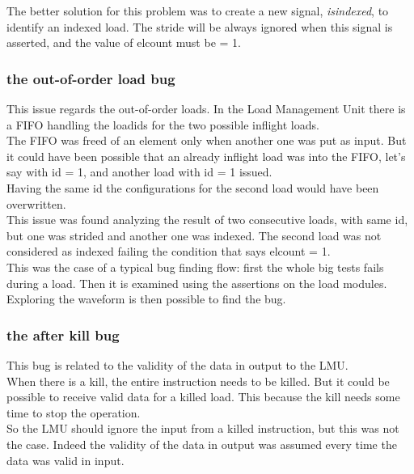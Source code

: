 The better solution for this problem was to create a new signal, \emph{is\+indexed}, to identify an indexed load. The stride will be always ignored when this signal is asserted, and the value of el\+count must be = 1.\\

\subsubsection{the out-of-order load bug}
This issue regards the out-of-order loads. In the Load Management Unit there is a FIFO handling the load\+ids for the two possible inflight loads.\\

The FIFO was freed of an element only when another one was put as input. But it could have been possible that an already inflight load was into the FIFO, let's say with id = 1, and another load with id = 1 issued. \\
Having the same id the configurations for the second load would have been overwritten.\\

This issue was found analyzing the result of two consecutive loads, with same id, but one was strided and another one was indexed. The second load was not considered as indexed failing the condition that says el\+count = 1.\\

This was the case of a typical bug finding flow: first the whole big tests fails during a load. Then it is examined using the assertions on the load modules. Exploring the waveform is then possible to find the bug.\\

\subsubsection{the after kill bug}
This bug is related to the validity of the data in output to the LMU.\\

When there is a kill, the entire instruction needs to be killed. But it could be possible to receive valid data for a killed load. This because the kill needs some time to stop the operation.\\

So the LMU should ignore the input from a killed instruction, but this was not the case. Indeed the validity of the data in output was assumed every time the data was valid in input.\\

